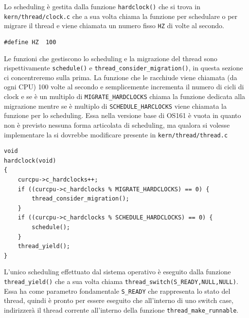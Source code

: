 Lo scheduling è gestita dalla funzione \lstinline{hardclock()} che si trova in \lstinline{kern/thread/clock.c} che a sua volta chiama la funzione per schedulare o per migrare il thread e viene chiamata un numero fisso \lstinline{HZ} di volte al secondo.
\begin{lstlisting}[caption=Quanti hardcloks al secondo in \lstinline{clock.h}]
#define HZ  100
\end{lstlisting}

Le funzioni che gestiscono lo scheduling e la migrazione del thread sono rispettivamente \lstinline{schedule()} e \lstinline{thread_consider_migration()}, in questa sezione ci concentreremo sulla prima.
La funzione che le racchiude viene chiamata (da ogni CPU) 100 volte al secondo e semplicemente incrementa il numero di cicli di clock e se è un multiplo di \lstinline{MIGRATE_HARDCLOCKS} chiama la funzione dedicata alla migrazione mentre se è multiplo di \lstinline{SCHEDULE_HARCLOCKS} viene chiamata la funzione per lo scheduling. Essa nella versione base di OS161 è vuota in quanto non è previsto nessuna forma articolata di scheduling, ma qualora si volesse implementare la si dovrebbe modificare presente in \lstinline{kern/thread/thread.c}

\begin{lstlisting}[caption={\lstinline{hardclock()} in \lstinline{clock.c}}]
void
hardclock(void)
{
	curcpu->c_hardclocks++;
	if ((curcpu->c_hardclocks % MIGRATE_HARDCLOCKS) == 0) {
		thread_consider_migration();
	}
	if ((curcpu->c_hardclocks % SCHEDULE_HARDCLOCKS) == 0) {
		schedule();
	}
	thread_yield();
}
\end{lstlisting}

L'unico scheduling effettuato dal sistema operativo è eseguito dalla funzione \lstinline{thread_yield()} che a sua volta chiama \lstinline{thread_switch(S_READY,NULL,NULL)}. Essa ha come parametro fondamentale \lstinline{S_READY} che rappresenta lo stato del thread, quindi è pronto per essere eseguito che all'interno di uno switch case, indirizzerà il thread corrente all'interno della funzione \lstinline{thread_make_runnable}.

